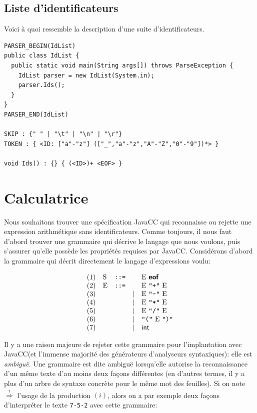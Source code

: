 \documentclass[11pt,a4paper]{article}
\newcommand{\assign}{\mbox{\texttt{::=}}\xspace}
\newcommand{\JavaCC}{\textsf{JavaCC}\xspace}
\newcommand{\str}[1]{\texttt{"{#1}"}}
\newcommand{\eof}{\textsf{\textbf{eof}}\xspace}
\newcommand{\expand}[1]{\stackrel{#1}{\Longrightarrow}}
\begin{document}
\subsection{Liste d'identificateurs}

\noindent
Voici à quoi ressemble la description d'une suite d'identificateurs.

{\small
\begin{verbatim}
PARSER_BEGIN(IdList)
public class IdList {
  public static void main(String args[]) throws ParseException {
    IdList parser = new IdList(System.in);
    parser.Ids();
  }
}
PARSER_END(IdList)

SKIP : {" " | "\t" | "\n" | "\r"}
TOKEN : { <ID: ["a"-"z"] (["_","a"-"z","A"-"Z","0"-"9"])*> }

void Ids() : {} { (<ID>)+ <EOF> }
\end{verbatim}
}

\section{Calculatrice}

Nous souhaitons trouver une spécification \JavaCC qui reconnaisse ou
rejette une expression arithmétique sans identificateurs. Comme
toujours, il nous faut d'abord trouver une grammaire qui décrive le
langage que nous voulons, puis s'assurer qu'elle possède les
propriétés requises par \JavaCC. Considérons d'abord la grammaire
qui décrit directement le langage d'expressions voulu:

\[
\begin{array}{llcrl}
  (1) & \textrm{S} & \assign &      & \textrm{E} \ \eof\\
  (2) & \textrm{E} & \assign &      &
    \textrm{E} \ \str{+} \ \textrm{E}\\
  (3) &   &         & \mid & \textrm{E} \ \str{-} \ \textrm{E}\\
  (4) &   &         & \mid & \textrm{E} \ \str{*} \ \textrm{E}\\
  (5) &   &         & \mid & \textrm{E} \ \str{/} \ \textrm{E}\\
  (6) &   &         & \mid & \str{(} \ \textrm{E} \ \str{)}\\
  (7) &   &         & \mid & \textsf{int}
\end{array}
\]

\noindent Il y a une raison majeure de rejeter cette grammaire pour
l'implantation avec \JavaCC (et l'immense majorité des générateurs
d'analyseurs syntaxiques): elle est \emph{ambiguë}. Une grammaire
est dite ambiguë lorsqu'elle autorise la reconnaissance d'un même
texte d'au moins deux façons différentes (en d'autres termes, il y a
plus d'un arbre de syntaxe concrète pour le même mot des feuilles). Si
on note $\expand{i}$ l'usage de la production $(i)$, alors on a par
exemple deux façons d'interpréter le texte \texttt{7-5-2} avec cette
grammaire:
\end{document}
